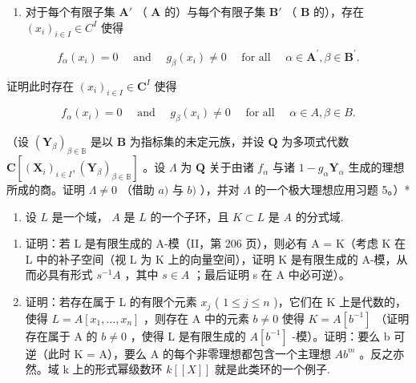 \begin{enumerate}
\def\labelenumi{\alph{enumi})}
\setcounter{enumi}{1}
\tightlist
\item
  对于每个有限子集 \(\mathbf{A}'\) （ \(\mathbf{A}\) 的）与每个有限子集 \(\mathbf{B}'\) （ \(\mathbf{B}\) 的），存在 \((x_i)_{i\in I} \in C^I\) 使得
\end{enumerate}

\[
f _ {\alpha} (x _ {i}) = 0 \quad \text { and } \quad g _ {\beta} (x _ {i}) \neq 0 \quad \text { for   all } \quad \alpha \in \mathbf {A} ^ {\prime}, \beta \in \mathbf {B} ^ {\prime}.
\]

证明此时存在 \((x_{i})_{i\in I}\in \mathbf{C}^{I}\) 使得

\[
f _ {\alpha} (x _ {i}) = 0 \quad \text { and } \quad g _ {\beta} (x _ {i}) \neq 0 \quad \text { for   all } \quad \alpha \in A, \beta \in B.
\]

（设 \((\mathbf{Y}_{\beta})_{\beta \in \mathbb{B}}\) 是以 \(\mathbf{B}\) 为指标集的未定元族，并设 \(\mathbf{Q}\) 为多项式代数 \(\mathbf{C}[(\mathbf{X}_i)_{i\in I}, (\mathbf{Y}_{\beta})_{\beta \in \mathbb{B}}]\) 。设 \(\Lambda\) 为 \(\mathbf{Q}\) 关于由诸 \(f_{\alpha}\) 与诸 \(1 - g_{\alpha}\mathbf{Y}_{\alpha}\) 生成的理想所成的商。证明 \(\Lambda \neq 0\) （借助 \(a)\) 与 \(b)\) ），并对 \(\Lambda\) 的一个极大理想应用习题 5。）*

\begin{enumerate}
\def\labelenumi{\arabic{enumi})}
\setcounter{enumi}{6}
\tightlist
\item
  设 \(L\) 是一个域， \(A\) 是 \(L\) 的一个子环，且 \(K \subset L\) 是 \(A\) 的分式域.
\end{enumerate}

\begin{enumerate}
\def\labelenumi{\alph{enumi})}
\item
  证明：若 L 是有限生成的 A-模（II，第 206 页），则必有 A = K（考虑 K 在 L 中的补子空间（视 L 为 K 上的向量空间），证明 K 是有限生成的 A-模，从而必具有形式 \(s^{-1}A\) ，其中 \(s \in A\) ；最后证明 s 在 A 中必可逆）。
\item
  证明：若存在属于 L 的有限个元素 \(x_{j}\) ( \(1 \leqslant j \leqslant n\) )，它们在 K 上是代数的，使得 \(L = A[x_{1}, \ldots, x_{n}]\) ，则存在 A 中的元素 \(b \neq 0\) 使得 \(K = A[b^{-1}]\) （证明存在属于 A 的 \(b \neq 0\) ，使得 L 是有限生成的 \(A[b^{-1}]\) -模）。证明：要么 b 可逆（此时 K = A），要么 A 的每个非零理想都包含一个主理想 \(Ab^{m}\) 。反之亦然。域 k 上的形式幂级数环 \(k[[X]]\) 就是此类环的一个例子.
\end{enumerate}

